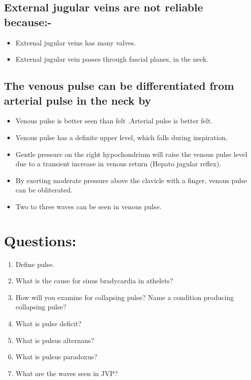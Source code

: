 \documentclass[a4paper,12pt,openany,oneside]{book}
\begin{document}
\subsection*{External jugular veins are not reliable because:-}
\begin{itemize}
	\item[]{External jugular veins has many valves.}
	\item[]{External jugular vein passes through fascial planes, in the neck. }
\end{itemize}
\subsection*{The venous pulse can be differentiated from arterial pulse in the neck by}
\begin{itemize}
\item[]{Venous pulse is better seen than felt .Arterial pulse is better felt.}
\item[]{Venous pulse has a definite upper level, which falls during inspiration.}
\item[]{Gentle pressure on the right hypochondrium will raise the venous pulse level due to a transient increase in venous return (Hepato jugular reflex).}
\item[]{By exerting moderate pressure above the clavicle with a finger, venous pulse can be obliterated.}
\item[]{Two to three waves can be seen in venous pulse.}
\end{itemize}

\section*{Questions:}
\begin{enumerate}
\item{Define pulse.}
\item{What is the cause for sinus bradycardia in athelets?}
\item{How will you examine for collapsing pulse? Name a condition producing collapsing pulse?}
\item{What is pulse deficit?}
\item{What is pulsus alternans?}
\item{What is pulsus paradoxus?}
\item{What are the waves seen in JVP?}
\end{enumerate}
\end{document}
